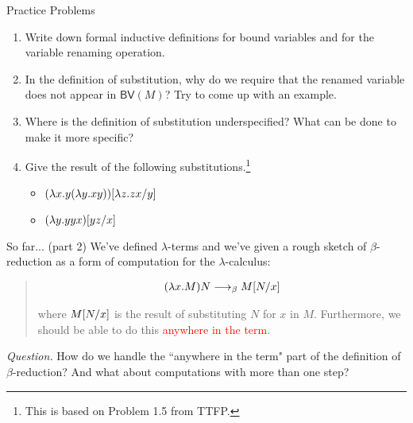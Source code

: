 \documentclass[10pt]{beamer}
\begin{document}
\begin{frame}[fragile]{Practice Problems}
\begin{enumerate}
  \item Write down formal inductive definitions for bound variables and for the variable renaming operation.
  \item In the definition of substitution, why do we require that the renamed variable does not appear in $\mathsf{BV}(M)$? Try to come up with an example.
  \item Where is the definition of substitution underspecified? What can be done to make it more specific?
  \item Give the result of the following substitutions.\footnote{This is based on Problem 1.5 from TTFP.}
    \begin{itemize}
      \item $(\lambda x . y (\lambda y . x y))[\lambda z . zx/y]$
      \item $(\lambda y . y y x)[yz/x]$
    \end{itemize}
\end{enumerate}
\end{frame}

\begin{frame}{So far... (part 2)}
We've defined $\lambda$-terms and we've given a rough sketch of $\beta$-reduction as a form of computation for the  $\lambda$-calculus:
\vfill

\begin{quote}
\begin{align*}
(\lambda x . M) N \longrightarrow_\beta M[N/x]
\end{align*}

where $M[N/x]$ is the result of substituting $N$ for $x$ in $M$. Furthermore, we should be able to do this \textcolor{red}{anywhere in the term}.
\end{quote}
\nxt


\textit{Question.} How do we handle the ``anywhere in the term" part of the definition of $\beta$-reduction? And what about computations with more than one step?

\end{frame}
\end{document}
